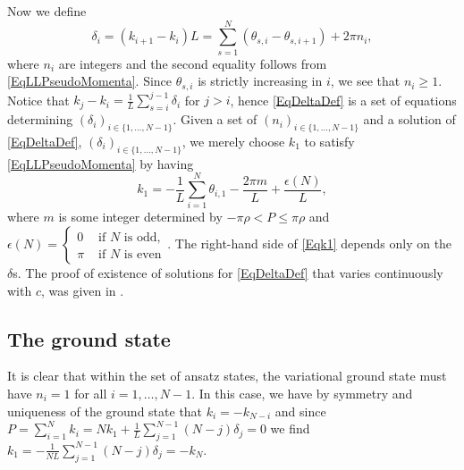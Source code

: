 Now we define \begin{equation}\label{EqDeltaDef}
\delta_i=(k_{i+1}-k_i)L=\sum_{s=1}^{N}(\theta_{s,i}-\theta_{s,i+1})+2\pi n_i,
\end{equation} where $ n_i $ are integers and the second equality follows from \eqref{EqLLPseudoMomenta}. Since $ \theta_{s,i} $ is strictly increasing in $ i $, we see that $ n_i\geq 1 $. Notice that $ k_j-k_i=\frac{1}{L}\sum_{s=i}^{j-1}\delta_i $ for $ j>i $, hence \eqref{EqDeltaDef} is a set of equations determining $ (\delta_i)_{i\in\{1,\ldots,N-1\}} $. Given a set of $ (n_i)_{i\in\{1,\ldots,N-1\}} $ and a solution of \eqref{EqDeltaDef}, $ (\delta_i)_{i\in\{1,\ldots,N-1\}} $, we merely choose $ k_1 $ to satisfy \eqref{EqLLPseudoMomenta} by having \begin{equation}\label{Eqk1}
	k_1=-\frac{1}{L}\sum_{i=1}^{N}\theta_{i,1}-\frac{2\pi m}{L}+\frac{\epsilon(N)}{L},
	\end{equation}
	where $ m $ is some integer determined by $ -\pi\rho <P\leq \pi\rho $ and\\ $ \epsilon(N)=\begin{cases}
	0&\text{ if } N\text{ is odd},\\
	\pi&\text{ if } N\text{ is even}
	\end{cases} $. The right-hand side of \eqref{Eqk1} depends only on the $ \delta $s. The proof of existence of solutions for \eqref{EqDeltaDef} that varies continuously with $ c $, was given in \cite{yang1969thermodynamics}.\\
	\subsection{The ground state}
	It is clear that within the set of ansatz states, the variational ground state must have $ n_i=1 $ for all $ i=1,\ldots, N-1 $. In this case, we have by symmetry and uniqueness of the ground state that $ k_i=-k_{N-i} $ and since $ P=\sum_{i=1}^{N}k_i=Nk_1+\frac{1}{L}\sum_{j=1}^{N-1}(N-j)\delta_j=0 $ we find $ k_1=-\frac{1}{NL}\sum_{j=1}^{N-1}(N-j)\delta_j=-k_N$.\\
	
